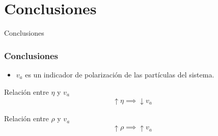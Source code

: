 \section{Conclusiones}

{
\begin{frame}
    \centering
  \Huge
  Conclusiones
\end{frame}
}

\begin{frame}

\frametitle{Conclusiones}
\begin{block}{}
    \begin{itemize}
        \item $v_a$ es un indicador de polarización de las partículas del sistema. 
    \end{itemize}
\end{block}

\begin{block}{Relación entre $\eta$ y $v_a$}
    \begin{align*}
        \uparrow \eta \implies \downarrow v_a
    \end{align*}
\end{block}

\begin{block}{Relación entre $\rho$ y $v_a$}
    \begin{align*}
        \uparrow \rho \implies \uparrow v_a
    \end{align*}
\end{block}

\end{frame}